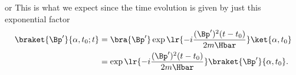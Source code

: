{\begin{equation}
\end{equation}
or
%
%
This is what we expect since the time evolution is given by just this exponential factor
%
\begin{equation}\label{eqn:freeParticlePropagator:220}
\begin{aligned}
\braket{\Bp'}{\alpha, t_0 ; t}
&= \bra{\Bp'} \exp\lr{ -i \frac{(\Bp')^2 (t -t_0)}{2 m \Hbar}} \ket{\alpha, t_0} \\
&=
\exp\lr{ -i \frac{(\Bp')^2 (t -t_0)}{2 m \Hbar}}
\braket{\Bp'}
{\alpha, t_0}.
\end{aligned}
\end{equation}
%
} %

